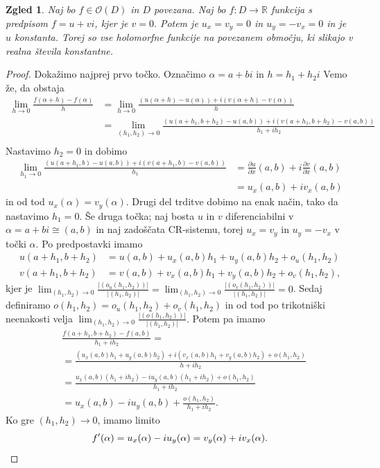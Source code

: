 \documentclass[10pt, a4paper]{article}
\newtheorem{zgled}{Zgled}[section]
\newenvironment{noticeC}{%
  \tcolorbox[%
  notitle,
  empty,
  enhanced,  %
  breakable,
  coltext=black, 
  fontupper=\rmfamily,
  parbox=false,
  noparskip,
  sharp corners,
  boxrule=-1pt,  %
  frame hidden,
  left=7pt,  %
  right=7pt,
  top=5pt,
  bottom=5pt,
  before skip=2.5ex plus 2pt,
  after skip=2.5ex plus 2pt,
  overlay unbroken and last={%
  },
  ]}
{\endtcolorbox}
\newenvironment{dokaz}%
  {\begin{noticeC}\begin{proof}}%
  {\end{proof}\end{noticeC}}
\newcommand{\R}{\mathbb {R}}
\begin{document}
\begin{zgled}
  Naj bo $f \in \mathcal{O}(D)$ in $D$ povezana. Naj bo $f: D \to \R$ funkcija s predpisom 
  $f = u + vi$, kjer je $v = 0.$ Potem je $u_x = v_y = 0$ in $u_y = -v_x = 0$ in je $u$ konstanta.
  Torej so vse holomorfne funkcije na povezanem območju, ki slikajo v realna števila konstantne. 
\end{zgled}

\begin{dokaz}
  Dokažimo najprej prvo točko.
  Označimo $\alpha = a + bi$ in $h = h_1 + h_2 i$
  Vemo že, da obstaja 
  \begin{align*}
    \lim_{h \to 0} \frac{f(\alpha + h) - f(\alpha)}{h} &= \lim_{h \to 0} \frac{(u(\alpha + h)- u(\alpha)) + i(v(\alpha + h) - v(\alpha))}{h}\\
    &= \lim_{(h_1, h_2) \to 0} \frac{(u(a + h_1, b + h_2)- u(a, b)) + i(v(a + h_1, b + h_2) - v(a, b))}{h_1 + ih_2}\\
  \end{align*}
  Nastavimo $h_2 = 0$ in dobimo 
  \begin{align*}
    \lim_{h_1 \to 0} \frac{(u(a + h_1, b) - u(a, b)) + i (v(a + h_1, b) - v(a, b))}{h_1} &= \frac{\partial u}{\partial x} (a, b) + i \frac{\partial v}{\partial x} (a, b)\\
    &= u_x (a, b) + i v_x (a, b)
  \end{align*}
  in od tod $u_x (\alpha) = v_y (\alpha)$. Drugi del trditve dobimo na enak način,
  tako da nastavimo $h_1 = 0.$ 
  Še druga točka; naj bosta $u$ in $v$ diferenciabilni v $\alpha = a + bi \cong (a, b)$
  in naj zadoščata CR-sistemu, torej $u_x = v_y$ in $u_y = -v_x$ v točki $\alpha$.
  Po predpostavki imamo
  \begin{align*}
    u(a + h_1, b + h_2) &= u(a, b) + u_x (a, b) h_1 + u_y (a, b) h_2 + o_u(h_1, h_2)\\
    v(a + h_1, b + h_2) &= v(a, b) + v_x (a, b) h_1 + v_y (a, b) h_2 + o_v(h_1, h_2),
  \end{align*}
  kjer je $\lim_{(h_1, h_2) \to 0}\frac{|(o_u (h_1, h_2))|}{|(h_1, h_2)|} = \lim_{(h_1, h_2) \to 0}\frac{|(o_v (h_1, h_2))|}{|(h_1, h_2)|} = 0$.
  Sedaj definiramo $o(h_1, h_2) = o_u (h_1, h_2) + o_v (h_1, h_2)$ in od tod po trikotniški neenakosti 
  velja $\lim_{(h_1, h_2) \to 0}\frac{|(o (h_1, h_2))|}{|(h_1, h_2)|}$. Potem pa imamo 
  \begin{align*}
    &\frac{f(a+h_1, b + h_2) - f(a, b)}{h_1 + i h_2} =\\
    &= \frac{(u_x (a, b) h_1 + u_y(a, b) h_2) + i (v_x (a, b) h_1 + v_y(a, b) h_2) + o(h_1, h_2)}{h + ih_2}\\
    &= \frac{u_x (a, b) (h_1 + ih_2) - i u_y (a, b) (h_1 + i h_2) + o(h_1, h_2)}{h_1 + i h_2}\\
    &= u_x (a, b) - i u_y (a, b) + \frac{o(h_1, h_2)}{h_1 + i h_2}.
  \end{align*}
  Ko gre $(h_1, h_2) \to 0$, imamo limito 
  \begin{equation*}
    f'(\alpha) = u_x (\alpha) - i u_y (\alpha) = v_y(\alpha) + i v_x (\alpha). \qedhere
   \end{equation*}
\end{dokaz}
\end{document}

